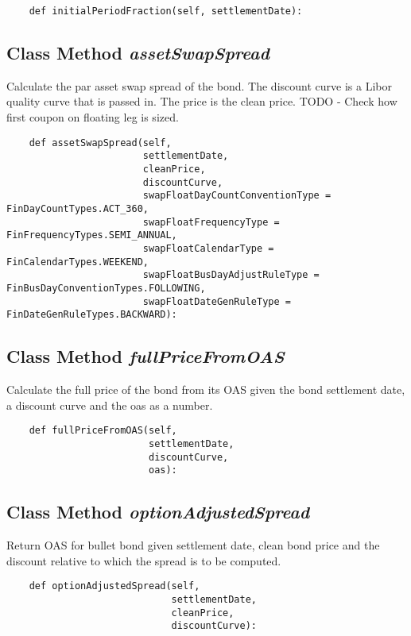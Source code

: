 \documentclass[twoside,11pt]{book}
\begin{document}
\begin{lstlisting}
    def initialPeriodFraction(self, settlementDate):
\end{lstlisting}

\subsection{Class Method {\it assetSwapSpread}}
Calculate the par asset swap spread of the bond. The discount curve is a Libor quality curve that is passed in. The price is the clean price. TODO - Check how first coupon on floating leg is sized. 

\begin{lstlisting}
    def assetSwapSpread(self, 
                        settlementDate, 
                        cleanPrice, 
                        discountCurve, 
                        swapFloatDayCountConventionType = FinDayCountTypes.ACT_360, 
                        swapFloatFrequencyType = FinFrequencyTypes.SEMI_ANNUAL,
                        swapFloatCalendarType = FinCalendarTypes.WEEKEND,
                        swapFloatBusDayAdjustRuleType = FinBusDayConventionTypes.FOLLOWING,
                        swapFloatDateGenRuleType = FinDateGenRuleTypes.BACKWARD):
\end{lstlisting}

\subsection{Class Method {\it fullPriceFromOAS}}
Calculate the full price of the bond from its OAS given the bond settlement date, a discount curve and the oas as a number. 

\begin{lstlisting}
    def fullPriceFromOAS(self, 
                         settlementDate, 
                         discountCurve, 
                         oas):
\end{lstlisting}

\subsection{Class Method {\it optionAdjustedSpread}}
Return OAS for bullet bond given settlement date, clean bond price and the discount relative to which the spread is to be computed. 

\begin{lstlisting}
    def optionAdjustedSpread(self, 
                             settlementDate, 
                             cleanPrice, 
                             discountCurve):
\end{lstlisting}
\end{document}
